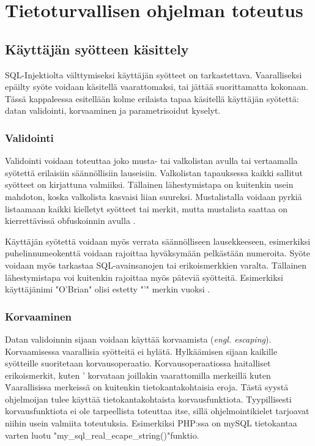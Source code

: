 \documentclass[finnish]{tktltiki2}
\theoremstyle{definition}
\theoremstyle{remark}
\begin{document}
	\section {Tietoturvallisen ohjelman toteutus}
	\subsection{Käyttäjän syötteen käsittely}
		SQL-Injektiolta välttymiseksi käyttäjän syötteet on tarkastettava. Vaaralliseksi epäilty syöte voidaan käsitellä vaarattomaksi, tai jättää suorittamatta kokonaan. Tässä kappaleessa esitellään kolme erilaista tapaa käsitellä käyttäjän syötettä: datan validointi, korvaaminen ja parametrisoidut kyselyt.
		
		 \subsubsection{Validointi}
		 Validointi voidaan toteuttaa joko musta- tai valkolistan avulla tai vertaamalla syötettä erilaisiin säännöllisiin lauseisiin. Valkolistan tapauksessa kaikki sallitut syötteet on kirjattuna valmiiksi. Tällainen lähestymistapa on kuitenkin usein mahdoton, koska valkolista kasvaisi liian suureksi. Mustalistalla voidaan pyrkiä listaamaan kaikki kielletyt syötteet tai merkit, mutta mustalista saattaa on kierrettävissä obfuskoinnin avulla \cite{encoding}. 
		
		Käyttäjän syötettä voidaan myös verrata säännölliseen lausekkeeseen, esimerkiksi puhelinnumeokenttä voidaan rajoittaa hyväksymään pelkästään numeroita. Syöte voidaan myös tarkastaa SQL-avainsanojen tai erikoismerkkien varalta. Tällainen lähestymistapa voi kuitenkin rajoittaa myös päteviä syötteitä. Esimerkiksi käyttäjänimi "O'Brian" olisi estetty "'" merkin vuoksi \cite{validointi}.
		
		
		\subsubsection{Korvaaminen}
		Datan validoinnin sijaan voidaan käyttää korvaamista (\textit{engl. escaping}). Korvaamisessa vaarallisia syötteitä ei hylätä. Hylkäämisen sijaan kaikille syötteille suoritetaan korvausoperaatio. Korvausoperaatiossa haitalliset erikoismerkit, kuten ' korvataan joillakin vaarattomilla merkeillä kuten \. Vaarallisissa merkeissä on kuitenkin tietokantakohtaisia eroja. Tästä syystä ohjelmoijan tulee käyttää tietokantakohtaista korvausfunktiota. Tyypillisesti korvausfunktiota ei ole tarpeellista toteuttaa itse, sillä ohjelmointikielet tarjoavat niihin usein valmiita toteutuksia. Esimerkiksi PHP:ssa on mySQL tietokantaa varten luotu "my{\_}sql{\_}real{\_}ecape\_string()"\space funktio. 
		
\end{document}
